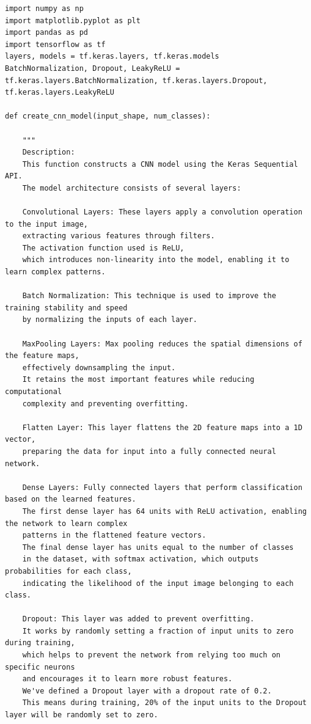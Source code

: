 \documentclass{article}
\begin{document}
\begin{lstlisting}[caption=CNN Functions code example, label=python_code]
import numpy as np
import matplotlib.pyplot as plt
import pandas as pd
import tensorflow as tf
layers, models = tf.keras.layers, tf.keras.models
BatchNormalization, Dropout, LeakyReLU = tf.keras.layers.BatchNormalization, tf.keras.layers.Dropout, tf.keras.layers.LeakyReLU

def create_cnn_model(input_shape, num_classes):

    """
    Description:
    This function constructs a CNN model using the Keras Sequential API.
    The model architecture consists of several layers:

    Convolutional Layers: These layers apply a convolution operation to the input image,
    extracting various features through filters.
    The activation function used is ReLU,
    which introduces non-linearity into the model, enabling it to learn complex patterns.

    Batch Normalization: This technique is used to improve the training stability and speed
    by normalizing the inputs of each layer.

    MaxPooling Layers: Max pooling reduces the spatial dimensions of the feature maps,
    effectively downsampling the input.
    It retains the most important features while reducing computational
    complexity and preventing overfitting.

    Flatten Layer: This layer flattens the 2D feature maps into a 1D vector,
    preparing the data for input into a fully connected neural network.

    Dense Layers: Fully connected layers that perform classification based on the learned features.
    The first dense layer has 64 units with ReLU activation, enabling the network to learn complex
    patterns in the flattened feature vectors.
    The final dense layer has units equal to the number of classes
    in the dataset, with softmax activation, which outputs probabilities for each class,
    indicating the likelihood of the input image belonging to each class.

    Dropout: This layer was added to prevent overfitting.
    It works by randomly setting a fraction of input units to zero during training,
    which helps to prevent the network from relying too much on specific neurons
    and encourages it to learn more robust features.
    We've defined a Dropout layer with a dropout rate of 0.2.
    This means during training, 20% of the input units to the Dropout layer will be randomly set to zero.


\end{lstlisting}
\end{document}
